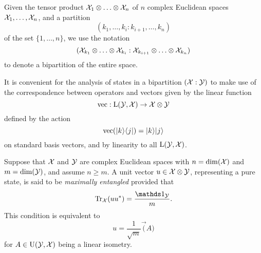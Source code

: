 Given the tensor product $\mathcal{X}_{1}\otimes\ldots\otimes\mathcal{X}_{n}$ of $n$ complex Euclidean spaces
$\mathcal{X}_{1},\ldots,\mathcal{X}_{n}$, and a partition 
\[ (k_{1},\ldots,k_{i} : k_{i+1},\ldots,k_{n}) \]
of the set $\{1, \ldots, n\}$, we use the notation 
\[ 
  (\mathcal{X}_{k_{1}}\otimes\ldots\otimes\mathcal{X}_{k_{i}} : \mathcal{X}_{k_{i+1}}\otimes\ldots\otimes\mathcal{X}_{k_{n}})
\]
to denote a bipartition of the entire space.

It is convenient for the analysis of states in a bipartition $(\mathcal{X}:\mathcal{Y})$ 
to make use of the correspondence between operators and vectors 
given by the linear function 
\begin{equation}
\label{eq:vec}
  \operatorname{vec} : \mathrm{L}(\mathcal{Y},\mathcal{X}) \rightarrow \mathcal{X}\otimes\mathcal{Y}
\end{equation}
defined by the action
\begin{equation}
  \operatorname{vec}(\lvert\mspace{0.5mu} k \mspace{0.5mu} \rangle\langle\mspace{0.5mu} j \mspace{0.5mu} \rvert) = \lvert\mspace{0.5mu} k \mspace{0.5mu} \rangle \lvert\mspace{0.5mu} j \mspace{0.5mu} \rangle
\end{equation}
on standard basis vectors, and by linearity to all $\mathrm{L}(\mathcal{Y},\mathcal{X})$.

\begin{definition}
\label{def:max-ent-states}
Suppose that $\mathcal{X}$ and $\mathcal{Y}$ are complex Euclidean spaces with $n = \dim(\mathcal{X})$ and 
$m = \dim(\mathcal{Y})$, and assume $n\geq m$.
A unit vector $u\in\mathcal{X}\otimes\mathcal{Y}$, representing a pure state, is said to be
\emph{maximally entangled} provided that
\begin{equation}
  \tr_{\X}(u u^{\ast}) = \frac{\I_{\Y}}{m}.
\end{equation}
This condition is equivalent to
\begin{equation}
  u = \frac{1}{\sqrt{m}} \vec(A)
\end{equation}
for $A\in\mathrm{U}(\mathcal{Y},\mathcal{X})$ being a linear isometry.
\end{definition}


